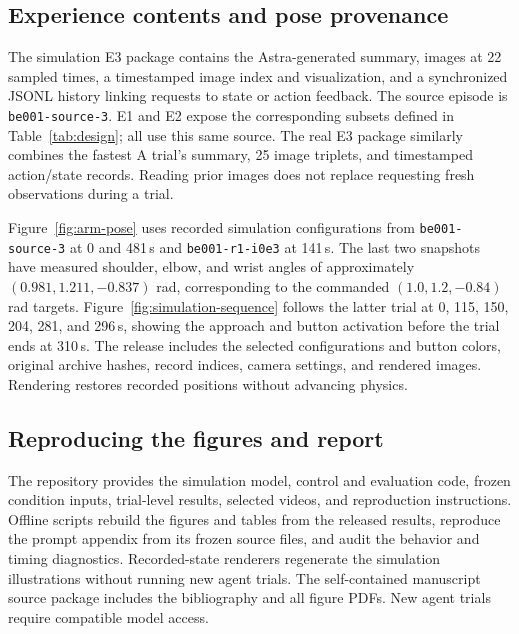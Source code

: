 \documentclass[11pt]{article}
\begin{document}
\subsection{Experience contents and pose provenance}
The simulation E3 package contains the Astra-generated summary, images at 22 sampled times, a timestamped image index and visualization, and a synchronized JSONL history linking requests to state or action feedback. The source episode is \texttt{be001-source-3}. E1 and E2 expose the corresponding subsets defined in Table~\ref{tab:design}; all use this same source. The real E3 package similarly combines the fastest A trial's summary, 25 image triplets, and timestamped action/state records. Reading prior images does not replace requesting fresh observations during a trial.

Figure~\ref{fig:arm-pose} uses recorded simulation configurations from \texttt{be001-source-3} at 0 and 481\,s and \texttt{be001-r1-i0e3} at 141\,s. The last two snapshots have measured shoulder, elbow, and wrist angles of approximately $(0.981,1.211,-0.837)$ rad, corresponding to the commanded $(1.0,1.2,-0.84)$ rad targets. Figure~\ref{fig:simulation-sequence} follows the latter trial at 0, 115, 150, 204, 281, and 296\,s, showing the approach and button activation before the trial ends at 310\,s. The release includes the selected configurations and button colors, original archive hashes, record indices, camera settings, and rendered images. Rendering restores recorded positions without advancing physics.

\subsection{Reproducing the figures and report}
The repository provides the simulation model, control and evaluation code, frozen condition inputs, trial-level results, selected videos, and reproduction instructions. Offline scripts rebuild the figures and tables from the released results, reproduce the prompt appendix from its frozen source files, and audit the behavior and timing diagnostics. Recorded-state renderers regenerate the simulation illustrations without running new agent trials. The self-contained manuscript source package includes the bibliography and all figure PDFs. New agent trials require compatible model access.
\end{document}

